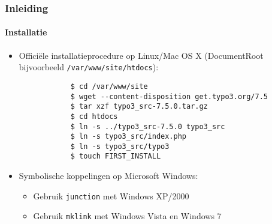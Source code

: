 \begin{frame}[fragile]
	\frametitle{Inleiding}
	\framesubtitle{Installatie}

	\begin{itemize}
		\item Officiële installatieprocedure op Linux/Mac OS X\newline
			(DocumentRoot bijvoorbeeld \texttt{/var/www/site/htdocs}):
		\begin{lstlisting}
			$ cd /var/www/site
			$ wget --content-disposition get.typo3.org/7.5
			$ tar xzf typo3_src-7.5.0.tar.gz
			$ cd htdocs
			$ ln -s ../typo3_src-7.5.0 typo3_src
			$ ln -s typo3_src/index.php
			$ ln -s typo3_src/typo3
			$ touch FIRST_INSTALL
		\end{lstlisting}

		\item Symbolische koppelingen op Microsoft Windows:

			\begin{itemize}
				\item Gebruik \texttt{junction} met Windows XP/2000
				\item Gebruik \texttt{mklink} met Windows Vista en Windows 7
			\end{itemize}

	\end{itemize}
\end{frame}

